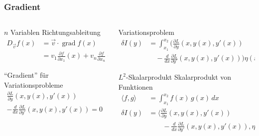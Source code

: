 %
%
%
\bgroup
\begin{frame}[t]
\setlength{\abovedisplayskip}{5pt}
\setlength{\belowdisplayskip}{5pt}
\frametitle{Gradient}
\vspace{-20pt}
\begin{columns}[t,onlytextwidth]
\begin{column}{0.44\textwidth}
\begin{block}{$n$ Variablen}
Richtungsableitung
\begin{align*}
D_{\vec{v}}f(x)
&=
\vec{v}\cdot
\operatorname{grad} f(x) 
\\
&=
v_1\frac{\partial f}{\partial x_1}(x)
+
v_n\frac{\partial f}{\partial x_n}(x)
\end{align*}
\end{block}
\begin{block}{``Gradient'' für Variationsprobleme}
\begin{gather*}
\frac{\partial L}{\partial y}(x,y(x),y'(x))\qquad\qquad
\\
-
\frac{d}{dx}
\frac{\partial L}{\partial y'}(x,y(x),y'(x))
=
0
\end{gather*}
\end{block}
\end{column}
\begin{column}{0.52\textwidth}
\begin{block}{Variationsproblem}
\begin{align*}
\delta I(y)
&=
\int_{x_1}^{x_2}
\biggl(
\frac{\partial L}{\partial y}(x,y(x),y'(x))
\\
&\quad
-
\frac{d}{dx}
\frac{\partial L}{\partial y'}(x,y(x),y'(x))
\biggr)\eta(x)\,dx
\end{align*}
\end{block}
\begin{block}{$L^2$-Skalarprodukt}
Skalarprodukt von Funktionen
\begin{align*}
\langle f,g\rangle
&=
\int_{x_1}^{x_2}
f(x)\,g(x)\,dx
\\
\delta I(y)
&=
\biggl\langle
\frac{\partial L}{\partial y}(x,y(x),y'(x))
\\
&\qquad
-
\frac{d}{dx}
\frac{\partial L}{\partial y'}(x,y(x),y'(x)),
\eta(x)
\biggr\rangle
\end{align*}
\end{block}
\end{column}
\end{columns}
\end{frame}
\egroup
